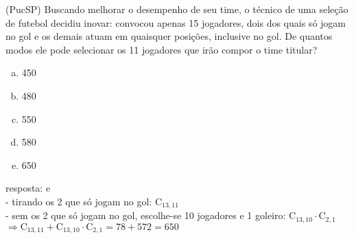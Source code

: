 \begin{ex}
 (PucSP) Buscando melhorar o desempenho de seu time, o técnico de uma seleção de futebol decidiu inovar:  convocou apenas 15 jogadores, dois dos quais só jogam no gol e os demais atuam em quaisquer posições, inclusive no gol. De quantos modos ele pode selecionar os 11 jogadores que irão compor o time titular?
    \begin{enumerate}[(a)]
    \item 450
    \item 480
    \item 550
    \item 580
    \item 650
    \end{enumerate}
      \begin{sol}
       resposta: e \\
       - tirando os 2 que só jogam no gol:  $\mathrm{C}_{{13},{11}}$  \\
       - sem os 2 que só jogam no gol, escolhe-se 10 jogadores e 1 goleiro: $\mathrm{C}_{{13},{10}}\cdot\mathrm{C}_{2,1}$\\
       $\Longrightarrow \mathrm{C}_{{13},{11}}+\mathrm{C}_{{13},{10}}\cdot\mathrm{C}_{2,1}=78+572=650$
      \end{sol}
    
\end{ex}